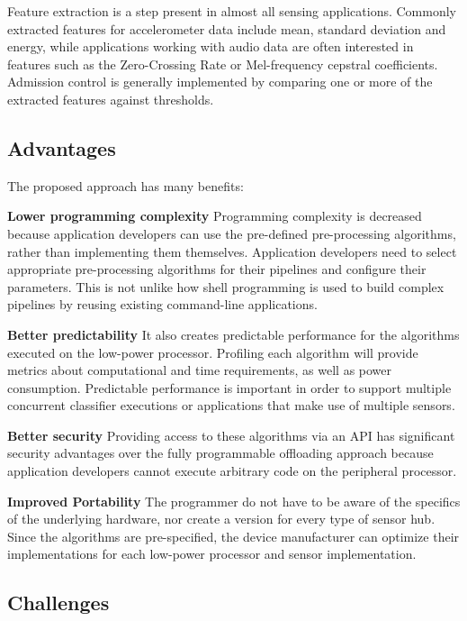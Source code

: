 Feature extraction is a
step present in almost all sensing applications.  Commonly extracted features 
for accelerometer data include mean, standard deviation and energy, while
applications working with audio data are often interested in features such as
the Zero-Crossing Rate or Mel-frequency cepstral coefficients.  Admission 
control is generally implemented by comparing one or more of the
extracted features against thresholds.


\subsection{Advantages}

The proposed approach has many benefits:


 {\bf Lower programming complexity}  Programming complexity is
  decreased because application developers can use the pre-defined
  pre-processing algorithms, rather than implementing them themselves. 
  Application developers need to select appropriate pre-processing 
  algorithms for their pipelines and configure their parameters. This 
  is not unlike how shell programming is used to build complex 
  pipelines by reusing existing command-line applications.
  

{\bf Better predictability} It also
  creates predictable performance for the algorithms executed on the
  low-power processor. Profiling each algorithm will provide metrics
  about computational and time requirements, as well as power
  consumption.  Predictable performance is important in order to
  support multiple concurrent classifier executions or applications
  that make use of multiple sensors.


{\bf Better security} Providing access to these algorithms via
  an API has significant security advantages over the fully
  programmable offloading approach because application developers
  cannot execute arbitrary code on the peripheral processor. 


{\bf Improved Portability} The programmer do not have to be
  aware of the specifics of the underlying hardware, nor  create a version
  for every type of sensor hub. Since the algorithms are
  pre-specified, the device manufacturer can optimize their
  implementations for each low-power processor and sensor
  implementation.



\subsection{Challenges}
\label{sec:challenges}

